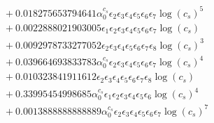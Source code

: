 \documentclass[10pt]{article}
\begin{document}
\begin{align*}
&{}  + 0.018275653794641 \alpha_{0}^{c_s} \epsilon_{2} \epsilon_{3} \epsilon_{4} \epsilon_{5} \epsilon_{6} \epsilon_{7} \log{\left(c_{s} \right)}^{5} \\
&{}  + 0.0022888021903005 \epsilon_{1} \epsilon_{2} \epsilon_{3} \epsilon_{4} \epsilon_{5} \epsilon_{6} \epsilon_{7} \log{\left(c_{s} \right)} \\
&{}  + 0.0092978733277052 \epsilon_{2} \epsilon_{3} \epsilon_{4} \epsilon_{5} \epsilon_{6} \epsilon_{7} \epsilon_{8} \log{\left(c_{s} \right)}^{3} \\
&{}  + 0.039664693833783 \alpha_{0}^{c_s} \epsilon_{2} \epsilon_{3} \epsilon_{4} \epsilon_{5} \epsilon_{6} \epsilon_{7} \log{\left(c_{s} \right)}^{4} \\
&{}  + 0.010323841911612 \epsilon_{2} \epsilon_{3} \epsilon_{4} \epsilon_{5} \epsilon_{6} \epsilon_{7} \epsilon_{8} \log{\left(c_{s} \right)} \\
&{}  + 0.33995454998685 \alpha_{0}^{c_s} \epsilon_{1} \epsilon_{2} \epsilon_{3} \epsilon_{4} \epsilon_{5} \epsilon_{6} \log{\left(c_{s} \right)}^{4} \\
&{}  + 0.0013888888888889 \alpha_{0}^{c_s} \epsilon_{2} \epsilon_{3} \epsilon_{4} \epsilon_{5} \epsilon_{6} \epsilon_{7} \log{\left(c_{s} \right)}^{7}
\end{align*}
\end{document}
